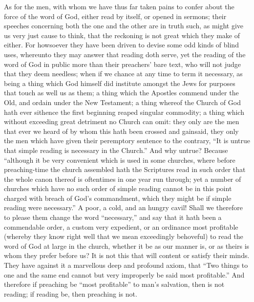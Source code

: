 As for the men, with whom we have thus far taken pains to confer about the force of the word of God, either read by itself, or opened in sermons; their speeches concerning both the one and the other are in truth such, as might give us very just cause to think, that the reckoning is not great which they make of either. For howsoever they have been driven to devise some odd kinds of blind uses, whereunto they may answer that reading doth serve, yet the reading of the word of God in public more than their preachers’ bare text, who will not judge that they deem needless; when if we chance at any time to term it necessary, as being a thing which God himself did institute amongst the Jews for purposes that touch as well us as them; a thing which the Apostles commend under the Old, and ordain under the New Testament; a thing whereof the Church of God hath ever sithence the first beginning reaped singular commodity; a thing which without exceeding great detriment no Church can omit: they only are the  men that ever we heard of by whom this hath been crossed and gainsaid, they only the men which have given their peremptory sentence to the contrary, “It is untrue that simple reading is necessary in the Church.” And why untrue? Because “although it be very convenient which is used in some churches, where before preaching-time the church assembled hath the Scriptures read in such order that the whole canon thereof is oftentimes in one year run through; yet a number of churches which have no such order of simple reading cannot be in this point charged with breach of God’s commandment, which they might be if simple reading were necessary.” A poor, a cold, and an hungry cavil! Shall we therefore to please them change the word “necessary,” and say that it hath been a commendable order, a custom very expedient, or an ordinance most profitable (whereby they know right well that we mean exceedingly behoveful) to read the word of God at large in the church, whether it be as our manner is, or as theirs is whom they prefer before us? It is not this that will content or satisfy their minds. They have against it a marvellous deep and profound axiom, that “Two things to one and the same end cannot but very improperly be said most profitable.” And therefore if preaching be “most profitable” to man’s salvation, then is not reading; if reading be, then preaching is not.
